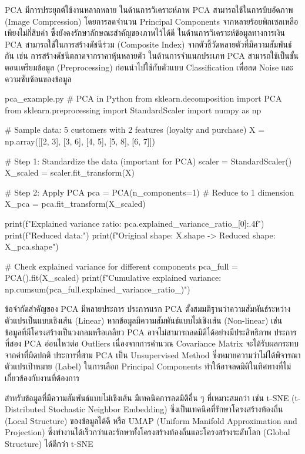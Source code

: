 PCA มีการประยุกต์ใช้งานหลากหลาย ในด้านการวิเคราะห์ภาพ PCA สามารถใช้ในการบีบอัดภาพ (Image Compression) โดยการลดจำนวน Principal Components จากหลายร้อยพิกเซลเหลือเพียงไม่กี่สิบค่า ซึ่งยังคงรักษาลักษณะสำคัญของภาพไว้ได้ดี ในด้านการวิเคราะห์ข้อมูลทางการเงิน PCA สามารถใช้ในการสร้างดัชนีร่วม (Composite Index) จากตัวชี้วัดหลายตัวที่มีความสัมพันธ์กัน เช่น การสร้างดัชนีตลาดจากราคาหุ้นหลายตัว ในด้านการจำแนกประเภท PCA สามารถใช้เป็นขั้นตอนเตรียมข้อมูล (Preprocessing) ก่อนนำไปใช้กับตัวแบบ Classification เพื่อลด Noise และความซับซ้อนของข้อมูล

\begin{pycode}{pca\_example.py}
# PCA in Python
from sklearn.decomposition import PCA
from sklearn.preprocessing import StandardScaler
import numpy as np

# Sample data: 5 customers with 2 features (loyalty and purchase)
X = np.array([[2, 3], [3, 6], [4, 5], [5, 8], [6, 7]])

# Step 1: Standardize the data (important for PCA)
scaler = StandardScaler()
X_scaled = scaler.fit_transform(X)

# Step 2: Apply PCA
pca = PCA(n_components=1)  # Reduce to 1 dimension
X_pca = pca.fit_transform(X_scaled)

print(f"Explained variance ratio: {pca.explained_variance_ratio_[0]:.4f}")
print(f"Reduced data:")
print(f"Original shape: {X.shape} -> Reduced shape: {X_pca.shape}")

# Check explained variance for different components
pca_full = PCA().fit(X_scaled)
print(f"Cumulative explained variance: {np.cumsum(pca_full.explained_variance_ratio_)}")
\end{pycode}

ข้อจำกัดสำคัญของ PCA มีหลายประการ ประการแรก PCA ตั้งสมมติฐานว่าความสัมพันธ์ระหว่างตัวแปรเป็นแบบเชิงเส้น (Linear) หากข้อมูลมีความสัมพันธ์แบบไม่เชิงเส้น (Non-linear) เช่น ข้อมูลที่มีโครงสร้างเป็นวงกลมหรือเกลียว PCA อาจไม่สามารถลดมิติได้อย่างมีประสิทธิภาพ ประการที่สอง PCA อ่อนไหวต่อ Outliers เนื่องจากการคำนวณ Covariance Matrix จะได้รับผลกระทบจากค่าที่ผิดปกติ ประการที่สาม PCA เป็น Unsupervised Method ซึ่งหมายความว่าไม่ได้พิจารณาตัวแปรเป้าหมาย (Label) ในการเลือก Principal Components ทำให้อาจลดมิติในทิศทางที่ไม่เกี่ยวข้องกับงานที่ต้องการ

สำหรับข้อมูลที่มีความสัมพันธ์แบบไม่เชิงเส้น มีเทคนิคการลดมิติอื่น ๆ ที่เหมาะสมกว่า เช่น t-SNE (t-Distributed Stochastic Neighbor Embedding) ซึ่งเป็นเทคนิคที่รักษาโครงสร้างท้องถิ่น (Local Structure) ของข้อมูลได้ดี หรือ UMAP (Uniform Manifold Approximation and Projection) ซึ่งทำงานได้เร็วกว่าและรักษาทั้งโครงสร้างท้องถิ่นและโครงสร้างระดับโลก (Global Structure) ได้ดีกว่า t-SNE

